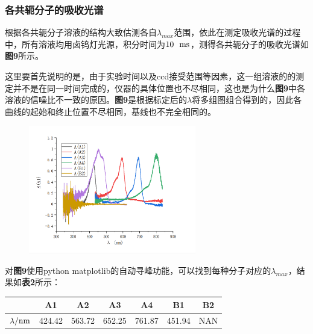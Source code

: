 \documentclass[12pt]{article}
\begin{document}
			\subsubsection{各共轭分子的吸收光谱}
			根据各共轭分子溶液的结构大致估测各自$\lambda_{max}$范围，依此在测定吸收光谱的过程中，所有溶液均用卤钨灯光源，积分时间为$10\ \ {\rm ms}$，测得各共轭分子的吸收光谱如\textbf{图9}所示。\par
			这里要首先说明的是，由于实验时间以及ccd接受范围等因素，这一组溶液的的测定并不是在同一时间完成的，仪器的具体位置也不尽相同，这也是为什么\textbf{图9}中各溶液的信噪比不一致的原因。\textbf{图9}是根据标定后的$\lambda$将多组图组合得到的，因此各曲线的起始和终止位置不尽相同，基线也不完全相同的。\par
			\begin{figure}[h]
				\centering
				\includegraphics[width=0.65\textwidth]{9.png}
			\end{figure}
			\par
			对\textbf{图9}使用python matplotlib的自动寻峰功能，可以找到每种分子对应的$\lambda_{max}$，结果如\textbf{表2}所示：\par
			\begin{table}[h]
				\centering
				\begin{tabular}{ccccccc}
					\toprule
					  & A1 & A2 & A3 & A4 & B1 & B2\\
					\midrule
					$\lambda/{\rm nm}$ 	& 424.42 & 563.72  & 652.25  & 761.87 & 451.94 & NAN \\
					\bottomrule
				\end{tabular}
			\end{table}
\end{document}
